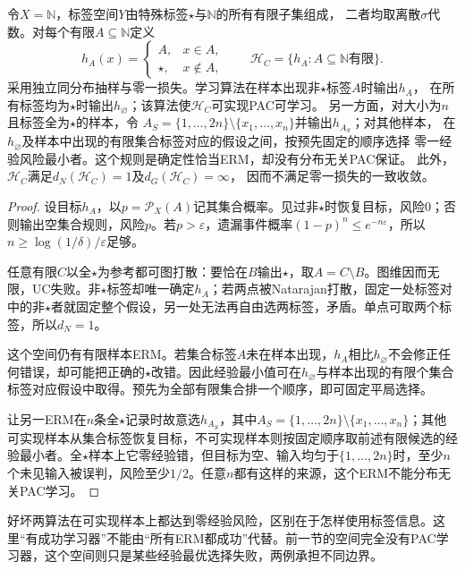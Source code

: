 \begin{theorem}[可学习性不推出一致收敛]
\label{thm:multiclass-erm-separation}
令$X=\mathbb N$，标签空间$Y$由特殊标签$\star$与$\mathbb N$的所有有限子集组成，
二者均取离散$\sigma$代数。对每个有限$A\subseteq\mathbb N$定义
\[
 h_A(x)=\begin{cases}A,&x\in A,\\\star,&x\notin A,\end{cases}
 \qquad
 \mathcal H_C=\{h_A:A\subseteq\mathbb N\text{有限}\}.
\]
采用独立同分布抽样与零一损失。学习算法在样本出现非$\star$标签$A$时输出$h_A$，
在所有标签均为$\star$时输出$h_{\varnothing}$；该算法使$\mathcal H_C$可实现PAC可学习。
另一方面，对大小为$n$且标签全为$\star$的样本，令
$A_S=\{1,\ldots,2n\}\setminus\{x_1,\ldots,x_n\}$并输出$h_{A_S}$；对其他样本，
在$h_{\varnothing}$及样本中出现的有限集合标签对应的假设之间，按预先固定的顺序选择
零一经验风险最小者。这个规则是确定性恰当ERM，却没有分布无关PAC保证。
此外，$\mathcal H_C$满足$d_N(\mathcal H_C)=1$及$d_G(\mathcal H_C)=\infty$，
因而不满足零一损失的一致收敛。
\end{theorem}

\begin{proof}
设目标$h_A$，以$p=\mathcal P_X(A)$记其集合概率。见过非$\star$时恢复目标，风险0；否则输出空集合规则，风险$p$。若$p>\varepsilon$，遗漏事件概率$(1-p)^n\leq e^{-n\varepsilon}$，所以$n\geq\log(1/\delta)/\varepsilon$足够。

任意有限$C$以全$\star$为参考都可图打散：要恰在$B$输出$\star$，取$A=C\setminus B$。图维因而无限，UC失败。非$\star$标签却唯一确定$h_A$；若两点被Natarajan打散，固定一处标签对中的非$\star$者就固定整个假设，另一处无法再自由选两标签，矛盾。单点可取两个标签，所以$d_N=1$。

这个空间仍有有限样本ERM。若集合标签$A$未在样本出现，$h_A$相比$h_{\varnothing}$不会修正任何错误，却可能把正确的$\star$改错。因此经验最小值可在$h_{\varnothing}$与样本出现的有限个集合标签对应假设中取得。预先为全部有限集合排一个顺序，即可固定平局选择。

让另一ERM在$n$条全$\star$记录时故意选$h_{A_S}$，其中$A_S=\{1,\ldots,2n\}\setminus\{x_1,\ldots,x_n\}$；其他可实现样本从集合标签恢复目标，不可实现样本则按固定顺序取前述有限候选的经验最小者。全$\star$样本上它零经验错，但目标为空、输入均匀于$\{1,\ldots,2n\}$时，至少$n$个未见输入被误判，风险至少$1/2$。任意$n$都有这样的来源，这个ERM不能分布无关PAC学习。
\end{proof}

好坏两算法在可实现样本上都达到零经验风险，区别在于怎样使用标签信息。这里“有成功学习器”不能由“所有ERM都成功”代替。前一节的空间完全没有PAC学习器，这个空间则只是某些经验最优选择失败，两例承担不同边界。

